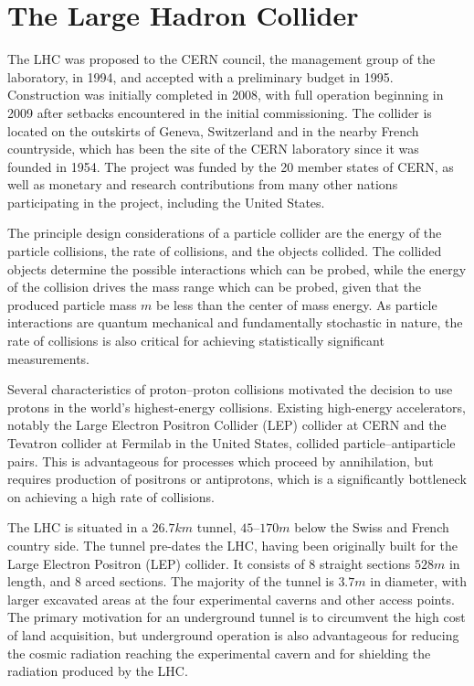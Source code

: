 \section{The Large Hadron Collider}
The LHC was proposed to the CERN council, the management group of the 
laboratory, in 1994, and accepted
with a preliminary budget in 1995. Construction was initially completed in
2008, with full operation beginning in 2009 after setbacks 
encountered in the initial commissioning.
The collider is located on the outskirts
of Geneva, Switzerland and in the nearby French countryside,
which has been the site of the CERN laboratory since it was founded in 1954.
The project was funded by the 20 member states of CERN, as well
as monetary and research contributions from many other nations participating 
in the project, including the United States.

The principle design considerations of a particle collider are the energy
of the particle collisions, the rate of collisions, and the objects collided.
The collided objects determine the possible interactions which can be probed,
while the energy of the collision drives the mass range which can be probed,
given that the produced particle mass $m$ be less than the 
center of mass energy. As particle interactions are quantum mechanical 
and fundamentally stochastic in nature, the rate of collisions is also 
critical for achieving statistically significant measurements.

Several characteristics of proton--proton collisions motivated the decision 
to use protons in the world's highest-energy collisions. Existing high-energy
accelerators, notably the Large Electron Positron Collider (LEP) collider
at CERN and the Tevatron collider at Fermilab in the United States, collided
particle--antiparticle pairs. This is advantageous for processes which proceed by annihilation, 
but requires production of positrons or antiprotons, which is a significantly
bottleneck on achieving a high rate of collisions. 

The LHC is situated in a $26.7\unit{km}$ tunnel, $45$--$170\unit{m}$
below the Swiss and French country side. The tunnel pre-dates the LHC,
having been originally built for the Large Electron Positron (LEP) collider.
It consists of 8 straight sections $528\unit{m}$ in length, and 8 arced sections.
The majority of the tunnel is $3.7\unit{m}$ in diameter, with larger excavated
areas at the four experimental caverns and other access points.
The primary motivation for an underground tunnel is to circumvent the high
cost of land acquisition, but underground operation is also advantageous for
reducing the cosmic radiation reaching the experimental cavern and  
for shielding the radiation produced by the LHC.

